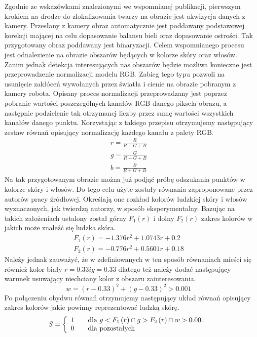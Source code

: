 Zgodnie ze wskazówkami znalezionymi we wspomnianej publikacji, pierwszym krokiem
na drodze do zlokalizowania twarzy na obrazie jest akwizycja danych z kamery.
Przesłany z kamery obraz automatycznie jest poddawany podstawowej korekcji
mającej na celu dopasowanie balansu bieli oraz  dopasowanie ostrości. Tak
przygotowany obraz poddawany jest binaryzacji. Celem wspomnianego procesu jest
odnalezienie na obrazie obszarów będących w kolorze skóry oraz włosów. Zanim
jednak detekcja interesujących nas obszarów będzie możliwa konieczne jest
przeprowadzenie normalizacji modelu RGB. Zabieg tego typu pozwoli na usunięcie
zakłóceń wywołanych przez światła i cienie na obrazie pobranym z kamery robota.
Opisany proces normalizacji przeprowadzany jest poprzez pobranie wartości
poszczególnych kanałów RGB danego piksela obrazu, a następnie podzielenie tak
otrzymanej liczby przez sumę wartości wszystkich kanałów danego punktu.
Korzystając z takiego przepisu otrzymujemy następujący zestaw równań opisujący
normalizację każdego kanału z palety RGB.
\begin{eqnarray}
r = \frac{R}{R + G +B}\\
g = \frac{G}{R + G +B}\\
b = \frac{B}{R + G +B}
\end{eqnarray}
Na tak przygotowanym obrazie można już podjąć próbę odszukania punktów w kolorze
skóry i włosów. Do tego celu użyte zostały równania zaproponowane przez autorów
pracy źródłowej. Określają one rozkład kolorów ludzkiej skóry i włosów
wyznaczonych, jak twierdzą autorzy, w sposób eksperymentalny. Bazując na takich
założeniach ustalony został górny $F_1(r)$ i dolny $F_2(r)$ zakres kolorów w
jakich może znaleźć się ludzka skóra.
\begin{eqnarray}
F_1\left(r\right) = -1.376r^2 + 1.0743r + 0.2\\
F_2\left(r\right) = -0.776r^2 + 0.5601r + 0.18
\end{eqnarray}
Należy jednak zauważyć, że w zdefiniowanych w ten sposób równaniach mieści się
również kolor biały $r = 0.33 i g = 0.33$ dlatego też należy dodać następujący
warunek usuwający niechciany kolor z obszaru zainteresowania.
\begin{equation}
w = \left(r - 0.33\right)^2 + \left(g - 0.33\right)^2 > 0.001
\end{equation}
Po połączeniu obydwu równań otrzymujemy następujący układ równań opisujący
zakres kolorów jakie powinny reprezentować ludzką skórę. 
\begin{equation}
S = \left\{ 
\begin{array}{l l}
  1 & \quad \mbox{dla $g < F_1\left(r\right) \cap g > F_2\left(r\right) \cap w
  > 0.001$}\\ 0 & \quad \mbox{dla pozostałych}\\ \end{array} \right. 
\end{equation}

